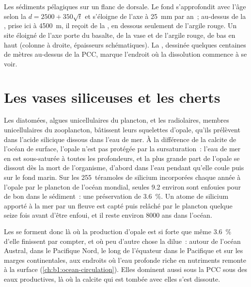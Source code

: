 \begin{omfigure}
{\small Les sédiments pélagiques sur un flanc de dorsale. Le fond s'approfondit avec l'âge selon la
 $d = 2500 + 350\sqrt t$ et s'éloigne de l'axe à
\qty{25}{mm} par an~; au-dessus de la , prise ici à
\qty{4500}{m}, il reçoit de la , en dessous seulement de l'argile rouge. Un site éloigné
de l'axe porte du basalte, de la vase et de l'argile rouge, de bas en haut (colonne à
droite, épaisseurs schématiques). La , dessinée quelques centaines de mètres
au-dessus de la PCC, marque l'endroit où la dissolution commence à se voir.}
\label{fig:b1:chemical-biogenic-sediments:flank}
\end{omfigure}

\section{Les vases siliceuses et les cherts}\label{sec:b1:chemical-biogenic-sediments:silica}

Les diatomées, algues unicellulaires du plancton, et les radiolaires, membres unicellulaires
du zooplancton, bâtissent leurs squelettes d'opale, qu'ils prélèvent dans
l'acide silicique dissous dans l'eau de mer. À la différence de la calcite de l'océan de surface,
l'opale n'est pas protégée par la sursaturation~: l'eau de mer en est sous-saturée
à toutes les profondeurs, et la plus grande part de l'opale se dissout dès la mort de l'organisme,
d'abord dans l'eau pendant qu'elle coule puis sur le fond marin. Sur les 255~téramoles
de silicium incorporées chaque année à l'opale par le plancton de l'océan mondial, seules
9.2 environ sont enfouies pour de bon dans le sédiment~: une préservation de
\qty{3.6}{\%}. Un atome de silicium apporté à la mer par un fleuve est capté puis
relâché par le plancton quelque seize fois avant d'être enfoui, et il
reste environ \num{8000} ans dans l'océan.

Les  se forment donc là où la production d'opale est si forte que même
\qty{3.6}{\%} d'elle finissent par compter, et où peu d'autre chose la dilue~: autour de
l'océan Austral, dans le Pacifique Nord, le long de l'équateur dans le Pacifique et sur les
marges continentales, aux endroits où l'eau profonde riche en nutriments remonte à
la surface (\cref{ch:b1:ocean-circulation}). Elles dominent aussi sous la PCC
sous des eaux productives, là où la calcite qui est tombée avec elles s'est dissoute.

